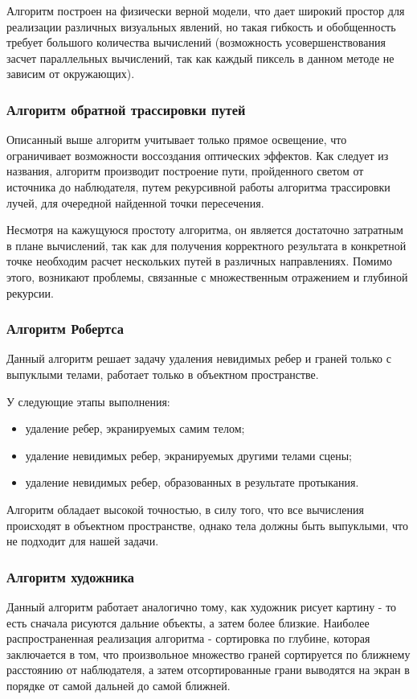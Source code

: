 Алгоритм построен на физически верной модели, что дает широкий
простор для реализации различных визуальных явлений, но такая гибкость и
обобщенность требует большого количества вычислений (возможность
усовершенствования засчет параллельных вычислений, так как каждый пиксель в
данном методе не зависим от окружающих).

\subsubsection{Алгоритм обратной трассировки путей}
Описанный выше алгоритм учитывает только прямое освещение, что ограничивает
возможности воссоздания оптических эффектов. Как следует из названия, алгоритм
производит построение пути, пройденного светом от источника до наблюдателя,
путем рекурсивной работы алгоритма трассировки лучей, для очередной найденной
точки пересечения.

Несмотря на кажущуюся простоту алгоритма, он является достаточно затратным
в плане вычислений, так как для получения корректного результата в конкретной
точке необходим расчет нескольких путей в различных направлениях. Помимо этого,
возникают проблемы, связанные с множественным отражением и глубиной рекурсии.

\subsubsection{Алгоритм Робертса}
Данный алгоритм решает задачу удаления невидимых ребер и граней только с
выпуклыми телами, работает только в объектном пространстве.

У следующие этапы выполнения:
\begin{itemize}
    \item удаление ребер, экранируемых самим телом;
    \item удаление невидимых ребер, экранируемых другими телами сцены;
    \item удаление невидимых ребер, образованных в результате протыкания.
\end{itemize}

Алгоритм обладает высокой точностью, в силу того, что все
вычисления происходят в объектном пространстве, однако тела должны быть
выпуклыми, что не подходит для нашей задачи.

\subsubsection{Алгоритм художника}
Данный алгоритм работает аналогично тому, как художник рисует картину -
то есть сначала рисуются дальние объекты, а затем более близкие. Наиболее
распространенная реализация алгоритма - сортировка по глубине, которая
заключается в том, что произвольное множество граней сортируется по ближнему
расстоянию от наблюдателя, а затем отсортированные грани выводятся на экран в
порядке от самой дальней до самой ближней.

